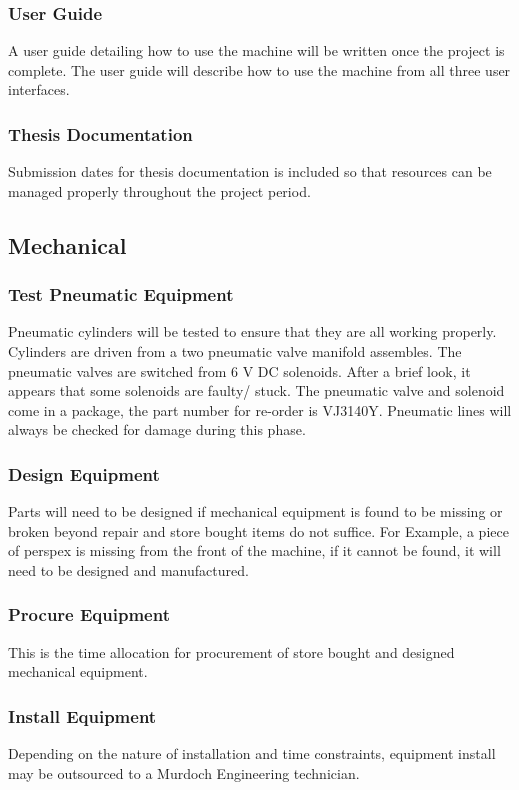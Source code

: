     \subsubsection{User Guide}
        A user guide detailing how to use the machine will be written once the project is complete. The user guide will describe how to use the machine from all three user interfaces. 
    \subsubsection{Thesis Documentation}
    Submission dates for thesis documentation is included so that resources can be managed properly throughout the project period. 
    
\subsection{Mechanical}
    \subsubsection{Test Pneumatic Equipment}
        Pneumatic cylinders will be tested to ensure that they are all working properly. Cylinders are driven from a two pneumatic valve manifold assembles. The pneumatic valves are switched from 6 V DC solenoids. After a brief look, it appears that some solenoids are faulty/ stuck. The pneumatic valve and solenoid come in a package, the part number for re-order is VJ3140Y. Pneumatic lines will always be checked for damage during this phase.
    \subsubsection{Design Equipment}
        Parts will need to be designed if mechanical equipment is found to be missing or broken beyond repair and store bought items do not suffice. For Example, a piece of perspex is missing from the front of the machine, if it cannot be found, it will need to be designed and manufactured.
    \subsubsection{Procure Equipment}
        This is the time allocation for procurement of store bought and designed mechanical equipment.
    \subsubsection{Install Equipment}
        Depending on the nature of installation and time constraints, equipment install may be outsourced to a Murdoch Engineering technician. 

